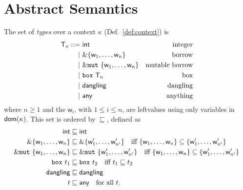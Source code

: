\section{Abstract Semantics}\label{sec:abstract_semantics}

\begin{definition}[Types]
  The set of \emph{types} over a context $\kappa$ (Def.~\ref{def:context}) is
  \begin{align*}
    \mathsf{T}_\kappa ::=&\ \mathsf{int} & \text{integer}\\
    | &\ \&\{\mathsf{w}_1,\ldots,\mathsf{w}_n\} & \text{borrow}\\
    | &\ \&\mathtt{mut}\ \{\mathsf{w}_1,\ldots,\mathsf{w}_n\} & \text{mutable borrow}\\
    | &\ \mathtt{box}\ \mathsf{T}_\kappa & \text{box}\\
    | &\ \mathsf{dangling} & \text{dangling}\\
    | &\ \mathsf{any} & \text{anything}
  \end{align*}
  where $n\ge 1$ and the $\mathsf{w}_i$, with $1\le i\le n$, are leftvalues
  using only variables in $\mathsf{dom}(\kappa)$. This set is ordered by $\sqsubseteq$, defined as
  \begin{align*}
    \mathsf{int}&\sqsubseteq\mathsf{int}\\
    \&\{\mathsf{w}_1,\ldots,\mathsf{w}_n\} & \sqsubseteq
    \&\{\mathsf{w}'_1,\ldots,\mathsf{w}'_{n'}\} \quad\text{iff $\{\mathsf{w}_1,\ldots,\mathsf{w}_n\}\subseteq\{\mathsf{w}'_1,\ldots,\mathsf{w}'_{n'}\}$}\\
    \&\mathtt{mut}\ \{\mathsf{w}_1,\ldots,\mathsf{w}_n\} & \sqsubseteq
    \&\mathtt{mut}\ \{\mathsf{w}'_1,\ldots,\mathsf{w}'_{n'}\} \quad\text{iff $\{\mathsf{w}_1,\ldots,\mathsf{w}_n\}\subseteq\{\mathsf{w}'_1,\ldots,\mathsf{w}'_{n'}\}$}\\
    \mathtt{box}\ t_1&\sqsubseteq\mathtt{box}\ t_2 \quad\text{iff $t_1\sqsubseteq t_2$}\\
    \mathsf{dangling}&\sqsubseteq\mathsf{dangling}\\
    t &\sqsubseteq\mathsf{any}\quad\text{for all $t$.}
  \end{align*}
\end{definition}

